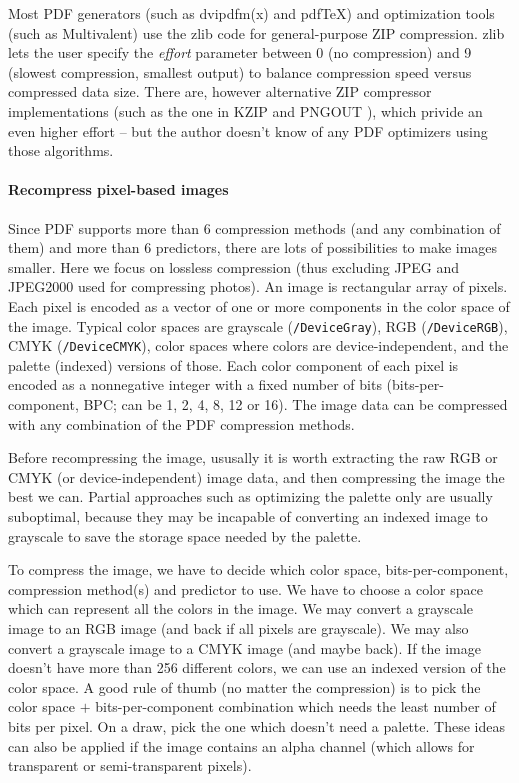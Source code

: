 \documentclass{ltugproc}
\def\cmd{\textsf}
\def\pkg{\textsf}
\begin{document}
Most PDF generators (such as \cmd{dvipdfm(x)} and pdf\TeX{}) and
optimization tools (such as Multivalent)
use the \pkg{zlib} code for general-purpose ZIP compression.
\pkg{zlib} lets the user specify the \emph{effort} parameter between 0 (no
compression) and 9 (slowest compression, smallest output) to balance
compression speed versus compressed data size. There are, however
alternative ZIP compressor implementations (such as the one in
KZIP \cite{kzip} and PNGOUT \cite{pngout}), which
privide an even higher effort -- but the author doesn't know of any PDF
optimizers using those algorithms.

\paragraph{Recompress pixel-based images}

Since PDF supports more than 6 compression methods (and any combination of
them) and more than 6 predictors, there are lots of possibilities to make
images smaller. Here we focus on lossless compression (thus excluding JPEG
and JPEG2000 used for compressing photos). An image is rectangular array of
pixels. Each pixel is encoded as a vector of one or more components in the
color space of the image. Typical color spaces are grayscale
(\texttt{/DeviceGray}), RGB (\texttt{/DeviceRGB}), CMYK
(\texttt{/DeviceCMYK}), color spaces where colors are device-independent,
and the palette (indexed) versions of those. Each color component of each
pixel is encoded as a nonnegative integer with a fixed number of bits
(bits-per-component, BPC; can be 1, 2, 4, 8, 12 or 16). The image data can be
compressed with any combination of the PDF compression methods.

Before recompressing the image, ususally it is worth extracting the raw RGB or
CMYK (or device-independent) image data, and then compressing the image the
best we can. Partial approaches such as optimizing the palette only are
usually suboptimal, because they may be incapable of converting an indexed
image to grayscale to save the storage space needed by the palette.

To compress the image, we have to decide which color space,
bits-per-component, compression method(s) and predictor to use. We have to
choose a color space which can represent all the colors in the image. We may
convert a grayscale image to an RGB image (and back if all pixels are
grayscale). We may also convert a grayscale image to a CMYK image (and maybe
back). If the image doesn't have more than 256 different colors, we can use
an indexed version of the color space. A good rule of thumb (no matter the
compression) is to pick the color space $+$ bits-per-component combination
which needs the least number of bits per pixel. On a draw, pick the one
which doesn't need a palette. These ideas can also be applied if the image
contains an alpha channel (which allows for transparent or semi-transparent
pixels).
\end{document}
